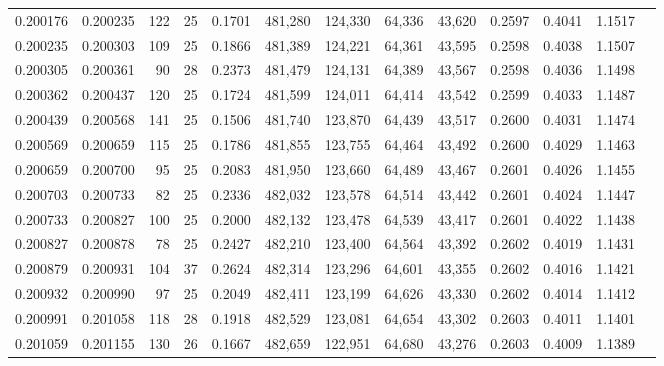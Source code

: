 \begin{tabular}{rrrrrrrrrrrrr}
0.200176 & 0.200235 & 122 &  25 &                                     0.1701 & 481,280 & 124,330 &  64,336 &  43,620 & 0.2597 & 0.4041 & 1.1517 \\
0.200235 & 0.200303 & 109 &  25 &                                     0.1866 & 481,389 & 124,221 &  64,361 &  43,595 & 0.2598 & 0.4038 & 1.1507 \\
0.200305 & 0.200361 &  90 &  28 &                                     0.2373 & 481,479 & 124,131 &  64,389 &  43,567 & 0.2598 & 0.4036 & 1.1498 \\
0.200362 & 0.200437 & 120 &  25 &                                     0.1724 & 481,599 & 124,011 &  64,414 &  43,542 & 0.2599 & 0.4033 & 1.1487 \\
0.200439 & 0.200568 & 141 &  25 &                                     0.1506 & 481,740 & 123,870 &  64,439 &  43,517 & 0.2600 & 0.4031 & 1.1474 \\
0.200569 & 0.200659 & 115 &  25 &                                     0.1786 & 481,855 & 123,755 &  64,464 &  43,492 & 0.2600 & 0.4029 & 1.1463 \\
0.200659 & 0.200700 &  95 &  25 &                                     0.2083 & 481,950 & 123,660 &  64,489 &  43,467 & 0.2601 & 0.4026 & 1.1455 \\
0.200703 & 0.200733 &  82 &  25 &                                     0.2336 & 482,032 & 123,578 &  64,514 &  43,442 & 0.2601 & 0.4024 & 1.1447 \\
0.200733 & 0.200827 & 100 &  25 &                                     0.2000 & 482,132 & 123,478 &  64,539 &  43,417 & 0.2601 & 0.4022 & 1.1438 \\
0.200827 & 0.200878 &  78 &  25 &                                     0.2427 & 482,210 & 123,400 &  64,564 &  43,392 & 0.2602 & 0.4019 & 1.1431 \\
0.200879 & 0.200931 & 104 &  37 &                                     0.2624 & 482,314 & 123,296 &  64,601 &  43,355 & 0.2602 & 0.4016 & 1.1421 \\
0.200932 & 0.200990 &  97 &  25 &                                     0.2049 & 482,411 & 123,199 &  64,626 &  43,330 & 0.2602 & 0.4014 & 1.1412 \\
0.200991 & 0.201058 & 118 &  28 &                                     0.1918 & 482,529 & 123,081 &  64,654 &  43,302 & 0.2603 & 0.4011 & 1.1401 \\
0.201059 & 0.201155 & 130 &  26 &                                     0.1667 & 482,659 & 122,951 &  64,680 &  43,276 & 0.2603 & 0.4009 & 1.1389 \\

\end{tabular}
